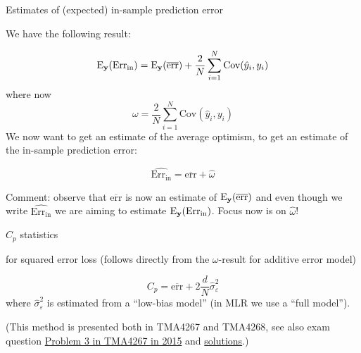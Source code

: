 \documentclass[
  ignorenonframetext,
]{beamer}
\begin{document}
\begin{frame}

\begin{block}{Estimates of (expected) in-sample prediction error}

We have the following result:

\[ \text{E}_{\bf y}(\text{Err}_{\text{in}})=\text{E}_{\bf y}(\overline{\text{err}})+\frac{2}{N} \sum_{i=1}^N \text{Cov}(\hat{y}_i,y_i)\]
where now \[ \omega=\frac{2}{N} \sum_{i=1}^N \text{Cov}(\hat{y}_i,y_i)\]
We now want to get an estimate of the average optimism, to get an
estimate of the in-sample prediction error:

\[ \widehat{\text{Err}_{\text{in}}}=\overline{\text{err}}+\hat{\omega}\]

Comment: observe that \(\overline{\text{err}}\) is now an estimate of
\(\text{E}_{\bf y}(\overline{\text{err}})\) and even though we write
\(\widehat{\text{Err}_{\text{in}}}\) we are aiming to estimate
\(\text{E}_{\bf y}(\text{Err}_{\text{in}})\). Focus now is on
\(\hat{\omega}\)!

\end{block}

\end{frame}

\begin{frame}

\begin{block}{\(C_p\) statistics}

for squared error loss (follows directly from the \(\omega\)-result for
additive error model)

\[C_p=\overline{\text{err}}+2\frac{d}{N}\hat{\sigma}_{\varepsilon}^2\]
where \(\hat{\sigma}_{\varepsilon}^2\) is estimated from a ``low-bias
model'' (in MLR we use a ``full model'').

(This method is presented both in TMA4267 and TMA4268, see also exam
question
\href{https://www.math.ntnu.no/emner/TMA4267/2017v/Exam/eV2015.pdf}{Problem
3 in TMA4267 in 2015} and
\href{https://www.math.ntnu.no/emner/TMA4267/2017v/Exam/lV2015.pdf}{solutions}.)

\end{block}

\end{frame}
\end{document}
